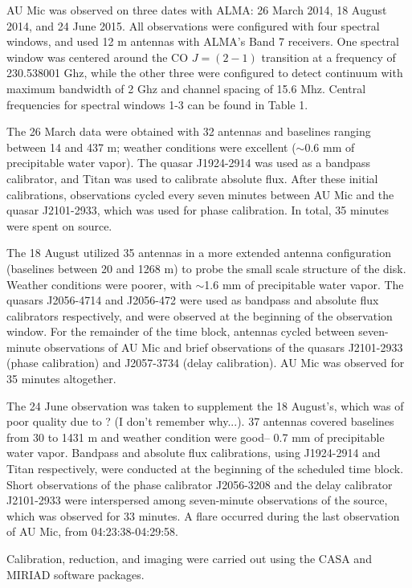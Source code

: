 \documentclass[a4paper]{tufte-handout}
\begin{document}
AU Mic was observed on three dates with ALMA: 26 March 2014, 18 August 2014, and 24 June 2015. All observations were configured with four spectral windows, and used 12 m antennas with ALMA's Band 7 receivers. One spectral window was centered around the CO $J = (2-1)$ transition at a frequency of 230.538001 Ghz, while the other three were configured to detect continuum with maximum bandwidth of 2 Ghz and channel spacing of 15.6 Mhz. Central frequencies for spectral windows 1-3 can be found in Table 1.

The 26 March data were obtained with 32 antennas and baselines ranging between  14 and 437 m; weather conditions were excellent ($\sim$0.6 mm of precipitable water vapor). The quasar J1924-2914 was used as a bandpass calibrator, and Titan was used to calibrate absolute flux. After these initial calibrations, observations cycled every seven minutes between AU Mic and the quasar J2101-2933, which was used for phase calibration. In total, 35 minutes were spent on source.

The 18 August utilized 35 antennas in a more extended antenna configuration (baselines between 20 and 1268 m) to probe the small scale structure of the disk. Weather conditions were poorer, with $\sim$1.6 mm of precipitable water vapor. The quasars J2056-4714 and J2056-472 were used as bandpass and absolute flux calibrators respectively, and were observed at the beginning of the observation window. For the remainder of the time block, antennas cycled between seven-minute observations of AU Mic and brief observations of the quasars J2101-2933 (phase calibration) and J2057-3734 (delay calibration). AU Mic was observed for 35 minutes altogether.

The 24 June observation was taken to supplement the 18 August's, which was of poor quality due to ? (I don't remember why...). 37 antennas covered baselines from 30 to 1431 m and weather condition were good-- 0.7 mm of precipitable water vapor. Bandpass and absolute flux calibrations, using J1924-2914 and Titan respectively, were conducted at the beginning of the scheduled time block. Short observations of the phase calibrator J2056-3208 and the delay calibrator J2101-2933 were interspersed among seven-minute observations of the source, which was observed for 33 minutes. A flare occurred during the last observation of AU Mic, from 04:23:38-04:29:58.

Calibration, reduction, and imaging were carried out using the CASA and MIRIAD software packages.
\end{document}
